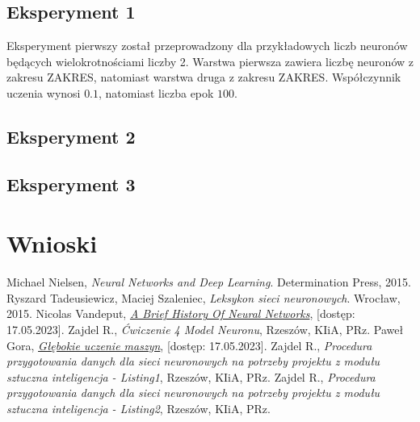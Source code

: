 \documentclass{article}
\begin{document}
\subsection{Eksperyment 1}
Eksperyment pierwszy został przeprowadzony dla przykładowych liczb neuronów będących wielokrotnościami liczby 2.
Warstwa pierwsza zawiera liczbę neuronów z zakresu ZAKRES, natomiast warstwa druga z zakresu ZAKRES.
Współczynnik uczenia wynosi $0.1$, natomiast liczba epok $100$.
\subsection{Eksperyment 2}
\subsection{Eksperyment 3}
\section{Wnioski}
\begin{thebibliography}{9}
    Michael Nielsen,
    \emph{Neural Networks and Deep Learning}.
    Determination Press,
    2015.
    Ryszard Tadeusiewicz, Maciej Szaleniec,
    \emph{Leksykon sieci neuronowych}.
    Wrocław,
    2015.
    Nicolas Vandeput,
    \href{https://medium.com/analytics-vidhya/a-brief-history-of-neural-networks-c234639a43f1}{\emph{A Brief History Of Neural Networks}},
    [dostęp: 17.05.2023].
    Zajdel R.,
    \emph{Ćwiczenie 4 Model Neuronu},
    Rzeszów,
    KIiA, PRz.
    Paweł Gora,
    \href{https://www.deltami.edu.pl/temat/informatyka/sztuczna_inteligencja/2017/12/28/Glebokie_uczenie_maszyn/}{\emph{Głębokie uczenie maszyn}},
    [dostęp: 17.05.2023].
    Zajdel R.,
    \emph{Procedura przygotowania danych dla sieci neuronowych na potrzeby projektu z modułu sztuczna inteligencja - Listing1},
    Rzeszów,
    KIiA, PRz.
    Zajdel R.,
    \emph{Procedura przygotowania danych dla sieci neuronowych na potrzeby projektu z modułu sztuczna inteligencja - Listing2},
    Rzeszów,
    KIiA, PRz.
\end{thebibliography}
\end{document}
